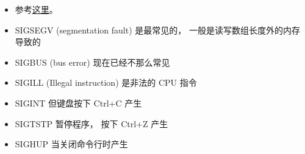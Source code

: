 
\begin{issues}
\issueDraft
\end{issues}

\begin{itemize}
\item 参考\href{https://unix.stackexchange.com/questions/6332/what-causes-various-signals-to-be-sent}{这里}。
\item SIGSEGV (segmentation fault) 是最常见的， 一般是读写数组长度外的内存导致的
\item SIGBUS (bus error) 现在已经不那么常见
\item SIGILL (Illegal instruction) 是非法的 CPU 指令
\item SIGINT 但键盘按下 Ctrl+C 产生
\item SIGTSTP 暂停程序， 按下 Ctrl+Z 产生
\item SIGHUP 当关闭命令行时产生
\end{itemize}

